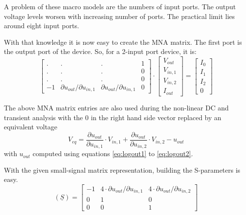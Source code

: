 A problem of these macro models are the numbers of input ports.
The output voltage levels worsen with increasing number of ports.
The practical limit lies around eight input ports.

\addvspace{12pt}

With that knowledge it is now easy to create the MNA matrix.  The
first port is the output port of the device.  So, for a 2-input port
device, it is:
\begin{equation}
\label{eq:DClogicMNA}
\begin{bmatrix}
.&.&.& 1\\
.&.&.& 0\\
.&.&.& 0\\
-1 & \partial u_{out}/ \partial u_{in,1} & \partial u_{out}/ \partial u_{in,1} & 0
\end{bmatrix}
\cdot
\begin{bmatrix}
V_{out}\\
V_{in,1}\\
V_{in,2}\\
I_{out}
\end{bmatrix}
=
\begin{bmatrix}
I_{0}\\
I_{1}\\
I_{2}\\
0
\end{bmatrix}
\end{equation}

The above MNA matrix entries are also used during the non-linear DC
and transient analysis with the 0 in the right hand side vector
replaced by an equivalent voltage
\begin{equation}
V_{eq} = \dfrac{\partial u_{out}}{\partial u_{in,1}}\cdot V_{in,1} +
         \dfrac{\partial u_{out}}{\partial u_{in,2}}\cdot V_{in,2} - u_{out}
\end{equation}
with $u_{out}$ computed using equations \eqref{eq:logout1} to
\eqref{eq:logout2}.

\addvspace{12pt}

With the given small-signal matrix representation, building the
S-parameters is easy.
\begin{equation}
(\underline{S}) =
\begin{bmatrix}
 -1 & 4\cdot\partial u_{out}/ \partial u_{in,1} & 4\cdot\partial u_{out}/ \partial u_{in,2} \\
 0  &  1 & 0\\
 0  &  0 &  1
\end{bmatrix}
\end{equation}

